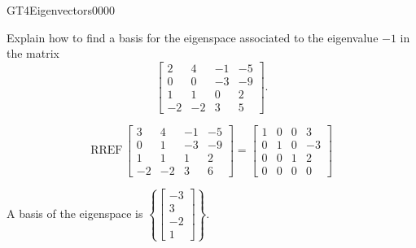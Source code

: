 \begin{exercise}{GT4}{Eigenvectors}{0000} 
\begin{exerciseStatement} 

Explain how to find a basis for the eigenspace associated to the eigenvalue \(-1\) in the matrix \[\left[\begin{array}{cccc}
2 & 4 & -1 & -5 \\
0 & 0 & -3 & -9 \\
1 & 1 & 0 & 2 \\
-2 & -2 & 3 & 5
\end{array}\right].\]

 \end{exerciseStatement}
 \begin{exerciseAnswer} 

\[\mathrm{RREF}\,\left[\begin{array}{cccc}
3 & 4 & -1 & -5 \\
0 & 1 & -3 & -9 \\
1 & 1 & 1 & 2 \\
-2 & -2 & 3 & 6
\end{array}\right]=\left[\begin{array}{cccc}
1 & 0 & 0 & 3 \\
0 & 1 & 0 & -3 \\
0 & 0 & 1 & 2 \\
0 & 0 & 0 & 0
\end{array}\right]\]

 

A basis of the eigenspace is \(\left\{ \left[\begin{array}{c}
-3 \\
3 \\
-2 \\
1
\end{array}\right] \right\}\).

 \end{exerciseAnswer}
 \end{exercise}


\newpage




